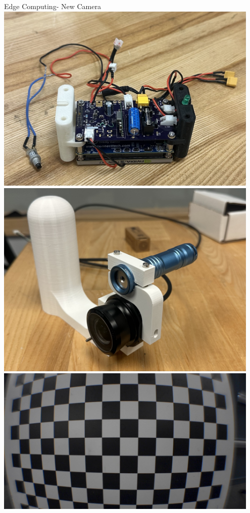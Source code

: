 \begin{frame}{Edge Computing- New Camera}
    \centering
    \includegraphics[height=0.8\textheight,width=0.95\textwidth,keepaspectratio]{images/IMG_4633.jpeg}
    \includegraphics[height=0.8\textheight,width=0.95\textwidth,keepaspectratio]{images/IMG_4635.jpeg}
    \includegraphics[height=0.8\textheight,width=0.95\textwidth,keepaspectratio]{images/close_exploreHD_screenshot_14.07.2025.png}
\end{frame}